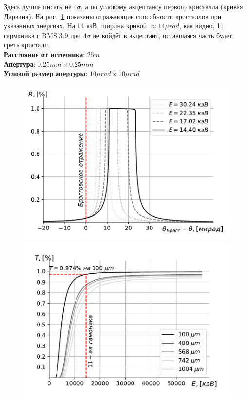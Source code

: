 \documentclass[14pt,a4paper]{extarticle}
\numberwithin{equation}{section}
\begin{document}
Здесь лучше писать не $4\sigma$, а по угловому акцептансу первого кристалла (кривая Дарвина). На рис.~\ref{fig:bragg_R} показаны отражающие способности кристаллов при указанных энергиях. На 14 кэВ, ширина кривой $\approx 14 \mu rad$, как видно, 11 гармоника с RMS 3.9 при $4\sigma$ не войдёт в акцептант, оставшаяся часть будет греть кристалл.\\
\textbf{Расстояние от источника}: $25m$\\
\textbf{Апертура}: $0.25mm \times 0.25mm$\\
\textbf{Угловой размер апертуры}: $10\mu rad \times  10 \mu rad$ 

\begin{figure}[htbp]
	\centering  
	\begin{minipage}{0.49\textwidth}
		\centering
		\includegraphics[width=\textwidth]{pic/bragg_R.pdf}
		\caption{}
		\label{fig:bragg_R}
	\end{minipage}\hfill
	\begin{minipage}{0.49\textwidth}
		\centering
		\includegraphics[width=\textwidth]{pic/bragg_T.pdf}

\end{minipage}
\end{figure}
\end{document}
